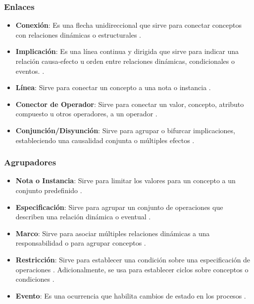 \subsubsection{Enlaces}
\begin{itemize}
	\item \textbf{Conexión}: Es una flecha unidireccional que sirve para conectar conceptos con relaciones dinámicas o estructurales \citep{zapata2007phd,zapata2012unc}.
	\item \textbf{Implicación}: Es una línea continua y dirigida que sirve para indicar una relación causa-efecto u orden entre relaciones dinámicas, condicionales o eventos. \citep{zapata2007phd,zapata2012unc}. 
	\item \textbf{Línea}: Sirve para conectar un concepto a una nota o instancia \citep{zapata2007phd,zapata2012unc}.
	\item \textbf{Conector de Operador}: Sirve para conectar un valor, concepto, atributo compuesto u otros operadores, a un operador \citep{zapata2012unc}. 
	\item \textbf{Conjunción/Disyunción}: Sirve para agrupar o bifurcar implicaciones, estableciendo una causalidad conjunta o múltiples efectos \citep{zapata2007phd,zapata2012unc}. 
\end{itemize}

\subsubsection{Agrupadores}
\begin{itemize}
	\item \textbf{Nota o Instancia}: Sirve para limitar los valores para un concepto a un conjunto predefinido \citep{zapata2007phd,zapata2012unc}.
	\item \textbf{Especificación}: Sirve para agrupar un conjunto de operaciones que describen una relación dinámica o eventual \citep{zapata2012unc}.
	\item \textbf{Marco}: Sirve para asociar múltiples relaciones dinámicas a una responsabilidad o para agrupar conceptos \citep{zapata2012unc}.
	\item \textbf{Restricción}: Sirve para establecer una condición sobre una especificación de operaciones \citep{zapata2012unc}. Adicionalmente, se usa para establecer ciclos sobre conceptos o condiciones \citep{JChaverra}.
	\item \textbf{Evento}: Es una ocurrencia que habilita cambios de estado en los procesos  \citep{zapata2013Eventos}.
\end{itemize}

